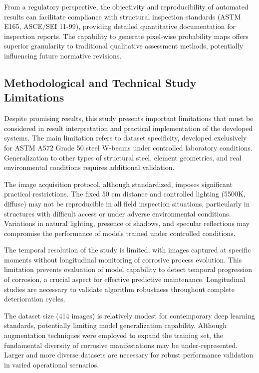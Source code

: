 \documentclass[12pt,a4paper,twoside]{article}
\begin{document}
From a regulatory perspective, the objectivity and reproducibility of automated results can facilitate compliance with structural inspection standards (ASTM E165, ASCE/SEI 11-99), providing detailed quantitative documentation for inspection reports. The capability to generate pixel-wise probability maps offers superior granularity to traditional qualitative assessment methods, potentially influencing future normative revisions.

\subsection{Methodological and Technical Study Limitations}
\label{subsec:limitations}

Despite promising results, this study presents important limitations that must be considered in result interpretation and practical implementation of the developed systems. The main limitation refers to dataset specificity, developed exclusively for ASTM A572 Grade 50 steel W-beams under controlled laboratory conditions. Generalization to other types of structural steel, element geometries, and real environmental conditions requires additional validation.

The image acquisition protocol, although standardized, imposes significant practical restrictions. The fixed 50 cm distance and controlled lighting (5500K, diffuse) may not be reproducible in all field inspection situations, particularly in structures with difficult access or under adverse environmental conditions. Variations in natural lighting, presence of shadows, and specular reflections may compromise the performance of models trained under controlled conditions.

The temporal resolution of the study is limited, with images captured at specific moments without longitudinal monitoring of corrosive process evolution. This limitation prevents evaluation of model capability to detect temporal progression of corrosion, a crucial aspect for effective predictive maintenance. Longitudinal studies are necessary to validate algorithm robustness throughout complete deterioration cycles.

The dataset size (414 images) is relatively modest for contemporary deep learning standards, potentially limiting model generalization capability. Although augmentation techniques were employed to expand the training set, the fundamental diversity of corrosive manifestations may be under-represented. Larger and more diverse datasets are necessary for robust performance validation in varied operational scenarios.
\end{document}
